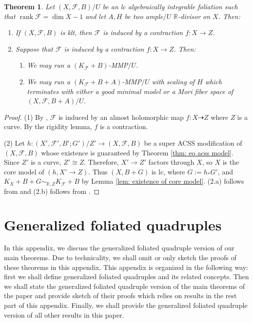 \documentclass[11pt]{amsart}
\numberwithin{equation}{section}
\newcommand{\Rr}{\mathbb{R}}
\newcommand{\rk}{\operatorname{rank}}
\newcommand{\Ff}{\mathcal{F}}
\newtheorem{thm}{Theorem}[section]
\theoremstyle{definition}
\theoremstyle{definition}
\theoremstyle{definition}
\begin{document}
\begin{thm}\label{thm: corank 1}
    Let $(X,\Ff,B)/U$ be an lc algebraically integrable foliation such that $\rk\Ff=\dim X-1$ and let $A,H$ be two ample$/U$ $\Rr$-divisor on $X$. Then:
    \begin{enumerate}
        \item If $(X,\Ff,B)$ is klt, then $\Ff$ is induced by a contraction $f: X\rightarrow Z$.
        \item Suppose that $\Ff$ is induced by a contraction $f: X\rightarrow Z$. Then:
        \begin{enumerate}
            \item We may run a $(K_{\Ff}+B)$-MMP$/U$.
            \item We may run a $(K_{\Ff}+B+A)$-MMP$/U$ with scaling of $H$ which terminates with either a good minimal model or a Mori fiber space of $(X,\Ff,B+A)/U$.
        \end{enumerate}
    \end{enumerate}
\end{thm}
\begin{proof}
    (1) By \cite[Theorem 2.1.10]{CHLX23}, $\Ff$ is induced by an almost holomorphic map $f: X\dashrightarrow Z$ where $Z$ is a curve. By the rigidity lemma, $f$ is a contraction.

    (2) Let $h: (X',\Ff',B';G')/Z'\rightarrow (X,\Ff,B)$ be a super ACSS modification of $(X,\Ff,B)$ whose existence is guaranteed by Theorem \ref{thm: eo acss model}. Since $Z'$ is a curve, $Z'\cong Z$. Therefore, $X'\rightarrow Z'$ factors through $X$, so $X$ is the core model of $(h, X'\rightarrow Z)$. Thus $(X,B+G)$ is lc, where $G:=h_*G'$, and $K_X+B+G\sim_{\mathbb R,Z}K_\Ff+B$ by Lemma \ref{lem: existence of core model}. (2.a) follows from \cite[Lemma 9.1.4]{CHLX23} and (2.b) follows from \cite[Theorem 16.1.4]{CHLX23}.
\end{proof}


\appendix


\section{Generalized foliated quadruples}\label{sec: gfq case}

In this appendix, we discuss the generalized foliated quadruple version of our main theorems. Due to technicality, we shall omit or only sketch the proofs of these theorems in this appendix. This appendix is organized in the following way: first we shall define generalized foliated quadruples and its related concepts. Then we shall state the generalized foliated quadruple version of the main theorems of the paper and provide sketch of their proofs which relies on results in the rest part of this appendix. Finally, we shall provide the generalized foliated quadruple version of all other results in this paper.
\end{document}
